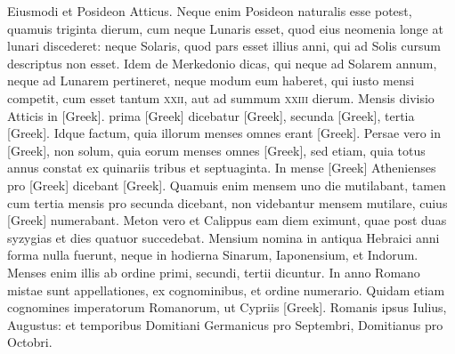 Eiusmodi et Posideon Atticus.
Neque enim Posideon
naturalis esse potest, quamuis triginta dierum, cum neque Lunaris
esset, quod eius neomenia longe at lunari discederet: neque Solaris,
quod pars esset illius anni, qui ad Solis cursum descriptus non esset.
Idem de Merkedonio dicas, qui neque ad Solarem annum, neque ad
Lunarem pertineret, neque modum eum haberet, qui iusto mensi
competit, cum esset tantum \textsc{xxii}, aut ad summum \textsc{xxiii} dierum.
Mensis divisio Atticis in \textgreek{[Greek]}.
 prima \textgreek{[Greek]} dicebatur \textgreek{[Greek]},
secunda \textgreek{[Greek]}, tertia \textgreek{[Greek]}.
Idque factum, quia
illorum menses omnes erant \textgreek{[Greek]}.
Persae vero in \textgreek{[Greek]},
non solum, quia eorum menses omnes \textgreek{[Greek]}, sed etiam, quia
totus annus constat ex quinariis tribus et septuaginta.
In mense \textgreek{[Greek]}
Athenienses pro \textgreek{[Greek]} dicebant \textgreek{[Greek]}.
Quamuis
enim mensem uno die mutilabant, tamen cum tertia mensis
pro secunda dicebant, non videbantur mensem mutilare, cuius
\textgreek{[Greek]} numerabant.
Meton vero et Calippus eam diem eximunt,
quae post duas syzygias et dies quatuor succedebat.
Mensium nomina
in antiqua Hebraici anni forma nulla fuerunt, neque in hodierna
Sinarum, Iaponensium, et Indorum.
Menses enim illis ab ordine
primi, secundi, tertii dicuntur.
In anno Romano mistae sunt appellationes,
ex cognominibus, et ordine numerario.
Quidam etiam cognomines
imperatorum Romanorum, ut Cypriis \textgreek{[Greek]}.
Romanis ipsus Iulius, Augustus: et temporibus Domitiani
Germanicus pro Septembri, Domitianus pro Octobri.

